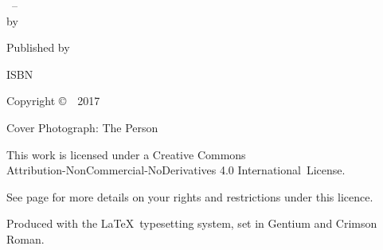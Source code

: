 \cleartoverso
\thispagestyle{empty}

{\copyrightsize
\centering
\setlength{\parindent}{0pt}%
\setlength{\parskip}{0.8\baselineskip}%

\thetitle\ -- \thesubtitle\\
by \theauthor

Published by \thePublisher

ISBN \theISBN

Copyright \copyright\ \thePublisher\ 2017

Cover Photograph: The Person

\vfill

{\footnotesize

This work is licensed under a Creative Commons\\
Attribution-NonCommercial-NoDerivatives 4.0 International~License.

See page \pageref{copyright-details} for more details on your rights and restrictions under this licence.

Produced with the \LaTeX\ typesetting system, set in Gentium and Crimson Roman.

\theEditionInfo

}}
